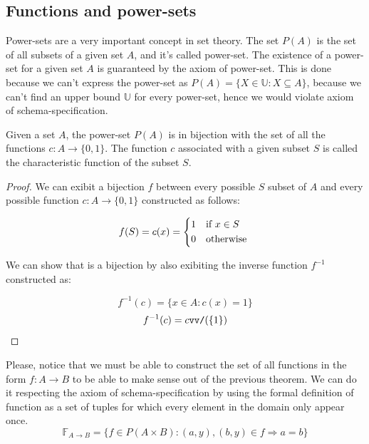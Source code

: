 \subsection{Functions and power-sets}
Power-sets are a very important concept in set theory. The set $P(A)$ is the set of all 
subsets of a given set $A$, and it's called power-set. The existence of a power-set 
for a given set $A$ is guaranteed by the axiom of power-set. This is done because we can't 
express the power-set as $P(A) = \{X \in \mathbb{U} : X \subseteq A\}$, because we can't find 
an upper bound $\mathbb{U}$ for every power-set, hence we would violate axiom of schema-specification. 

\begin{theorem}
    Given a set $A$, the power-set $P(A)$ is in bijection with the set of all the 
    functions $c : A \rightarrow \{0,1\}$. The function $c$ associated with a given subset $S$ is called 
    the characteristic function of the subset $S$.
\end{theorem}
\begin{proof}
    We can exibit a bijection $f$ between every possible $S$ subset of $A$ and every possible
    function $c : A \rightarrow \{0,1\}$ constructed as follows:

    \begin{equation*}
        f(S) = c(x) = 
        \begin{cases*}
            1 & if \(x \in S\)  \\
            0 & otherwise
        \end{cases*}
    \end{equation*}

    We can show that is a bijection by also exibiting the inverse function $f^{-1}$
    constructed as:

    $$ f^{-1}(c) = \{ x \in A : c(x) = 1 \} $$
    $$ f^{-1}(c) = \cev{c}(\{1\}) $$
\end{proof}

Please, notice that we must be able to construct the set of all functions in 
the form $ f : A \rightarrow B $ to be able to make sense out of the previous
theorem. We can do it respecting the axiom of schema-specification by using 
the formal definition of function as a set of tuples for which every element 
in the domain only appear once. \\

$$ \mathbb{F}_{A \rightarrow B} = \{ f \in P(A \times B) : (a, y), (b, y) \in f \Rightarrow a = b \} $$ \\

